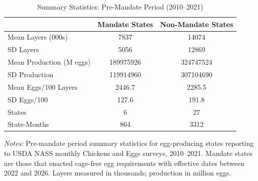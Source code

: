 \begin{table}[htbp]
\centering
\caption{Summary Statistics: Pre-Mandate Period (2010--2021)}
\label{tab:sumstats}
\begin{tabular}{lcc}
\hline\hline
 & Mandate States & Non-Mandate States \\
\hline
Mean Layers (000s) & 7837 & 14074 \\
SD Layers & 5056 & 12869 \\
Mean Production (M eggs) & 189975926 & 324747524 \\
SD Production & 119914960 & 307104690 \\
Mean Eggs/100 Layers & 2446.7 & 2285.5 \\
SD Eggs/100 & 127.6 & 191.8 \\
States & 6 & 27 \\
State-Months & 864 & 3312 \\
\hline\hline
\end{tabular}
\begin{tablenotes}[flushleft]
\small
\item \textit{Notes:} Pre-mandate period summary statistics for egg-producing states reporting to USDA NASS monthly Chickens and Eggs surveys, 2010--2021. Mandate states are those that enacted cage-free egg requirements with effective dates between 2022 and 2026. Layers measured in thousands; production in million eggs.
\end{tablenotes}
\end{table}

